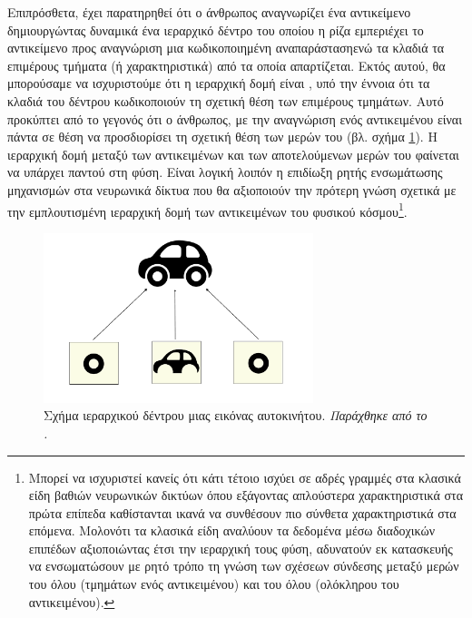 Επιπρόσθετα, έχει παρατηρηθεί ότι ο άνθρωπος αναγνωρίζει ένα αντικείμενο δημιουργώντας δυναμικά ένα ιεραρχικό δέντρο του οποίου η ρίζα εμπεριέχει το αντικείμενο προς αναγνώριση  μια κωδικοποιημένη αναπαράσταση\textemdash ενώ τα κλαδιά τα επιμέρους τμήματα (ή χαρακτηριστικά) από τα οποία απαρτίζεται. Εκτός αυτού, θα μπορούσαμε να ισχυριστούμε ότι η ιεραρχική δομή είναι , υπό την έννοια ότι τα κλαδιά του δέντρου κωδικοποιούν τη σχετική θέση των επιμέρους τμημάτων\cite{hinton2021represent_GLOM}. Αυτό προκύπτει από το γεγονός ότι ο άνθρωπος, με την αναγνώριση ενός αντικειμένου είναι πάντα σε θέση να προσδιορίσει τη σχετική θέση των μερών του (βλ. σχήμα \ref{fig:car}). Η ιεραρχική δομή μεταξύ των αντικειμένων και των αποτελούμενων μερών του φαίνεται να υπάρχει παντού στη φύση. Είναι λογική λοιπόν η επιδίωξη ρητής ενσωμάτωσης μηχανισμών στα νευρωνικά δίκτυα που θα αξιοποιούν την πρότερη γνώση σχετικά με την εμπλουτισμένη ιεραρχική δομή των αντικειμένων του φυσικού κόσμου\footnote{Μπορεί να ισχυριστεί κανείς ότι κάτι τέτοιο ισχύει σε αδρές γραμμές στα κλασικά είδη βαθιών νευρωνικών δικτύων όπου εξάγοντας απλούστερα χαρακτηριστικά στα πρώτα επίπεδα καθίστανται ικανά να συνθέσουν πιο σύνθετα χαρακτηριστικά στα επόμενα. Μολονότι τα κλασικά είδη αναλύουν τα δεδομένα μέσω διαδοχικών επιπέδων αξιοποιώντας έτσι την ιεραρχική τους φύση, αδυνατούν εκ κατασκευής να ενσωματώσουν με ρητό τρόπο τη γνώση των σχέσεων σύνδεσης μεταξύ μερών του όλου (τμημάτων ενός αντικειμένου) και του όλου (ολόκληρου του αντικειμένου).}.\par
\begin{figure}[h]
  \centering
  \includegraphics[width=0.7\textwidth]{images/chapter theoritical background/car_tree.pdf}
  \caption{Σχήμα ιεραρχικού δέντρου μιας εικόνας αυτοκινήτου. \textit{Παράχθηκε από το \href{https://inkscape.org/}{}.}} 
  \label{fig:car}
\end{figure} 
